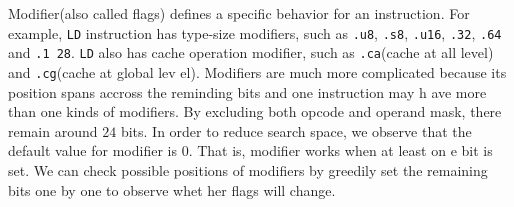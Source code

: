 Modifier(also called flags) defines a specific behavior for an instruction. For example,
{\tt LD} instruction has type-size modifiers, such as {\tt .u8}, {\tt .s8}, {\tt .u16}, {\tt .32}, {\tt .64} and {\tt .1
28}. {\tt LD} also has cache operation modifier, such as {\tt .ca}(cache at all level) and {\tt .cg}(cache at global lev
el). Modifiers are much more complicated because its position spans accross the reminding bits and one instruction may h
ave more than one kinds of modifiers. By excluding both opcode and operand mask, there remain around $24$ bits. In order
 to reduce search space, we observe that the default value for modifier is $0$. That is, modifier works when at least on
e bit is set. We can check possible positions of modifiers by greedily set the remaining bits one by one to observe whet
her flags will change.
